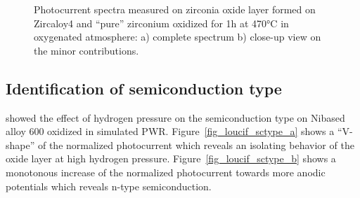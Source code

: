 \begin{figure}[h]
        \caption{Photocurrent spectra measured on zirconia oxide layer formed on 
        Zircaloy4 and “pure” zirconium oxidized for 1h at 470°C in oxygenated 
        atmosphere\citep{benaboud2007}: a) complete spectrum b) close-up view on the minor contributions.}
        \label{fig_benaboud_minor_oxides}
    \end{figure}



\subsection{Identification of semiconduction type}
    \citet{loucif2013} showed the effect of hydrogen pressure on 
    the semiconduction type on Nibased alloy 600 oxidized in simulated PWR. 
    Figure~\ref{fig_loucif_sctype_a} shows a “V-shape” of the normalized photocurrent which 
    reveals an isolating behavior of the oxide layer at high hydrogen pressure. 
    Figure~\ref{fig_loucif_sctype_b} shows a monotonous increase of the 
    normalized photocurrent towards more anodic potentials which reveals 
    n-type semiconduction.

